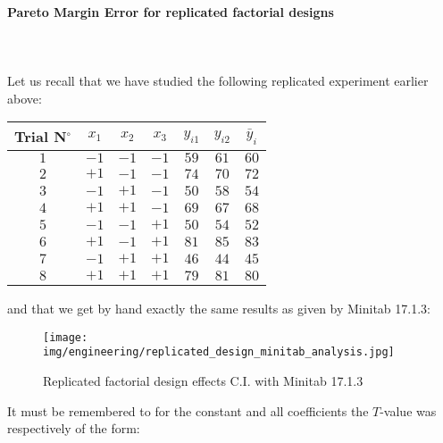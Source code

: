 	\paragraph{Pareto Margin Error for replicated factorial designs}\mbox{}\\\\
	Let us recall that we have studied the following replicated experiment earlier above:
	\begin{table}[H]\centering
	\begin{center}
			\begin{tabular}{|c|c|c|c|c|c|c|}
				\hline
				\multicolumn{1}{c}{\cellcolor{black!30}\textbf{Trial N${}^\circ$}} & 
  \multicolumn{1}{c}{\cellcolor{black!30}$x_1$} & 
  \multicolumn{1}{c}{\cellcolor{black!30}$x_2$} & 
  \multicolumn{1}{c}{\cellcolor{black!30}$x_3$} & 
  \multicolumn{1}{c}{\cellcolor{black!30}$y_{i1}$} & 
  \multicolumn{1}{c}{\cellcolor{black!30}$y_{i2}$} & 
  \multicolumn{1}{c}{\cellcolor{black!30}$\bar{y}_i$}\\ \hline
				 $1$ & $-1$ & $-1$ & $-1$ & $59$ & $61$ & $60$\\ \hline
				 $2$ & $+1$ & $-1$ & $-1$ & $74$ & $70$ & $72$\\ \hline
				 $3$ & $-1$ & $+1$ & $-1$ & $50$ & $58$ & $54$\\ \hline
				 $4$ & $+1$ & $+1$ & $-1$ & $69$ & $67$ & $68$\\ \hline
				 $5$ & $-1$ & $-1$ & $+1$ & $50$ & $54$ & $52$\\ \hline
				 $6$ & $+1$ & $-1$ & $+1$ & $81$ & $85$ & $83$\\ \hline
				 $7$ & $-1$ & $+1$ & $+1$ & $46$ & $44$ & $45$\\ \hline
				 $8$ & $+1$ & $+1$ & $+1$ & $79$ & $81$ & $80$\\ \hline
		\end{tabular}
	\end{center}
	\end{table}
	and that we get by hand exactly the same results as given by Minitab 17.1.3:
	\begin{figure}[H]
		\begin{center}
		\texttt{[image: img/engineering/replicated\_design\_minitab\_analysis.jpg]}
		\end{center}	
		\caption[]{Replicated factorial design effects C.I. with Minitab 17.1.3}
	\end{figure}
	It must be remembered to for the constant and all coefficients the $T$-value was respectively of the form:
	
